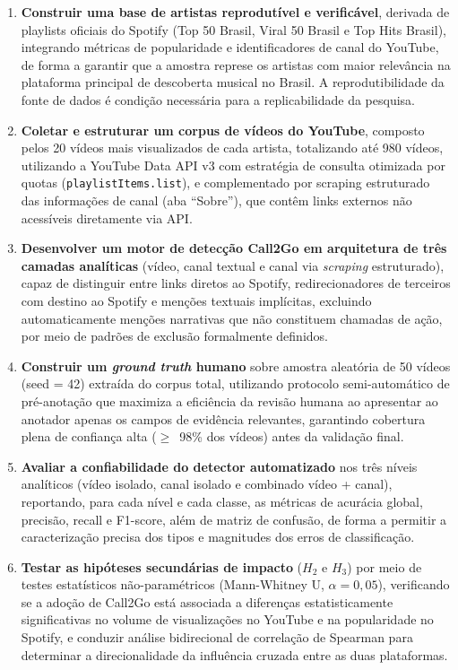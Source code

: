 \documentclass[12pt, a4paper]{article}
\begin{document}
\begin{enumerate}

    \item \textbf{Construir uma base de artistas reprodutível e verificável}, derivada de playlists oficiais do Spotify (Top 50 Brasil, Viral 50 Brasil e Top Hits Brasil), integrando métricas de popularidade e identificadores de canal do YouTube, de forma a garantir que a amostra represe os artistas com maior relevância na plataforma principal de descoberta musical no Brasil. A reprodutibilidade da fonte de dados é condição necessária para a replicabilidade da pesquisa.

    \item \textbf{Coletar e estruturar um corpus de vídeos do YouTube}, composto pelos 20 vídeos mais visualizados de cada artista, totalizando até 980 vídeos, utilizando a YouTube Data API v3 com estratégia de consulta otimizada por quotas (\texttt{playlistItems.list}), e complementado por scraping estruturado das informações de canal (aba ``Sobre''), que contêm links externos não acessíveis diretamente via API.

    \item \textbf{Desenvolver um motor de detecção Call2Go em arquitetura de três camadas analíticas} (vídeo, canal textual e canal via \textit{scraping} estruturado), capaz de distinguir entre links diretos ao Spotify, redirecionadores de terceiros com destino ao Spotify e menções textuais implícitas, excluindo automaticamente menções narrativas que não constituem chamadas de ação, por meio de padrões de exclusão formalmente definidos.

    \item \textbf{Construir um \textit{ground truth} humano} sobre amostra aleatória de 50 vídeos (seed = 42) extraída do corpus total, utilizando protocolo semi-automático de pré-anotação que maximiza a eficiência da revisão humana ao apresentar ao anotador apenas os campos de evidência relevantes, garantindo cobertura plena de confiança alta ($\geq$~98\% dos vídeos) antes da validação final.

    \item \textbf{Avaliar a confiabilidade do detector automatizado} nos três níveis analíticos (vídeo isolado, canal isolado e combinado vídeo + canal), reportando, para cada nível e cada classe, as métricas de acurácia global, precisão, recall e F1-score, além de matriz de confusão, de forma a permitir a caracterização precisa dos tipos e magnitudes dos erros de classificação.

    \item \textbf{Testar as hipóteses secundárias de impacto} ($H_2$ e $H_3$) por meio de testes estatísticos não-paramétricos (Mann-Whitney U, $\alpha = 0{,}05$), verificando se a adoção de Call2Go está associada a diferenças estatisticamente significativas no volume de visualizações no YouTube e na popularidade no Spotify, e conduzir análise bidirecional de correlação de Spearman para determinar a direcionalidade da influência cruzada entre as duas plataformas.

\end{enumerate}
\end{document}
